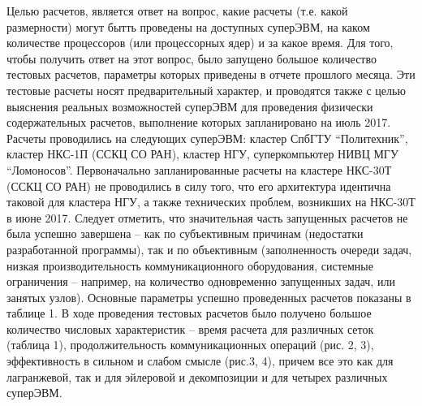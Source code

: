 Целью расчетов,  является ответ на вопрос, какие расчеты (т.е. какой размерности) могут бытть проведены на доступных суперЭВМ, на каком количестве процессоров (или процессорных ядер) и за какое время. 
Для того, чтобы получить ответ на этот вопрос, было запущено большое количество тестовых расчетов, параметры которых приведены в отчете прошлого месяца. Эти тестовые расчеты носят предварительный характер, и проводятся также с целью выяснения реальных возможностей суперЭВМ для проведения физически содержательных расчетов, выполнение которых запланировано   на июль 2017. 	Расчеты проводились на следующих суперЭВМ: кластер СпбГТУ “Политехник”, кластер НКС-1П (ССКЦ СО РАН), кластер НГУ,  суперкомпьютер НИВЦ МГУ “Ломоносов”. Первоначально запланированные расчеты на кластере НКС-30Т  (ССКЦ СО РАН) не проводились в силу того, что его архитектура идентична таковой для кластера НГУ, а также технических проблем, возникших на НКС-30Т в июне 2017.
Следует отметить, что значительная часть запущенных расчетов не была успешно завершена – как по субъективным причинам (недостатки разработанной программы), так и по объективным (заполненность очереди задач, низкая производительность коммуникационного оборудования, системные ограничения – например, на количество одновременно запущенных задач, или занятых узлов). Основные параметры успешно проведенных расчетов показаны в таблице 1. 
В ходе проведения тестовых расчетов было получено большое количество числовых характеристик – время расчета для различных сеток (таблица 1), продолжительность коммуникационных операций (рис. 2, 3), эффективность в сильном и слабом смысле (рис.3, 4), причем все это как для лагранжевой, так и для эйлеровой и декомпозиции и для четырех различных суперЭВМ. 






